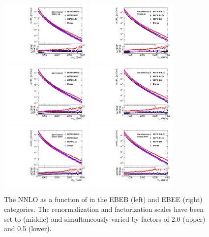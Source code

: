 \begin{figure}[p]
  \centering
  \includegraphics[angle=0,width=0.40\textwidth]{figures/BB_hist1_R2F2.pdf}
  \includegraphics[angle=0,width=0.40\textwidth]{figures/BE_hist1_R2F2.pdf}
  \includegraphics[angle=0,width=0.40\textwidth]{figures/BB_hist1_R1F1.pdf}
  \includegraphics[angle=0,width=0.40\textwidth]{figures/BE_hist1_R1F1.pdf}
  \includegraphics[angle=0,width=0.40\textwidth]{figures/BB_hist1_R0p5F0p5.pdf}
  \includegraphics[angle=0,width=0.40\textwidth]{figures/BE_hist1_R0p5F0p5.pdf}
  \caption{The NNLO \Kfactor as a function of \Mgg in the EBEB (left) and EBEE (right) categories. The renormalization and factorization scales have been set to \mgg (middle) and simultaneously varied by factors of 2.0 (upper) and 0.5 (lower).}
  \label{fig:kfactor_mgg}
\end{figure}


